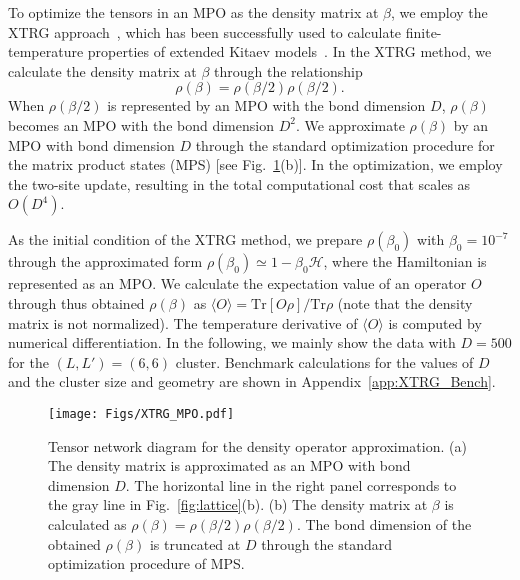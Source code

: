 \documentclass[twocolumn,superscriptaddress,showpacs, longbibliography, aps, prx]{revtex4-2}
\begin{document}
To optimize the tensors in an MPO as the density matrix at $\beta$, 
we employ the XTRG approach~\cite{Chen2018}, which has been successfully used to calculate finite-temperature properties of extended Kitaev models~\cite{Li2020, LiZWWGQLGL2021}. 
In the XTRG method, we calculate the density matrix at $\beta$ through the relationship
\begin{equation}
  \rho(\beta)=\rho(\beta/2)\rho(\beta/2).
\end{equation}
When $\rho(\beta/2)$ is represented by an MPO with the bond dimension $D$, $\rho(\beta)$ becomes an MPO with the bond dimension $D^2$. 
We approximate $\rho(\beta)$ by an MPO with bond dimension $D$ through the standard optimization procedure for the matrix product states (MPS) \cite{Chen2018} [see Fig.~\ref{fig:XTRG}(b)]. 
In the optimization, we employ the two-site update, resulting in the total computational cost that scales as $O(D^4)$. 

As the initial condition of the XTRG method, we prepare $\rho(\beta_0)$ with $\beta_0 = 10^{-7}$ through the approximated form $\rho(\beta_0) \simeq 1 - \beta_0\mathcal{H}$, where the Hamiltonian is represented as an MPO. 
We calculate the expectation value of an operator ${O}$ through thus obtained $\rho(\beta)$ as $\langle {O} \rangle = \mathrm{Tr}[{O}\rho] /\mathrm{Tr}\rho$ (note that the density matrix is not normalized). 
The temperature derivative of $\langle {O} \rangle$ is computed by numerical differentiation.
In the following, we mainly show the data with $D=500$ for the $(L, L') = (6, 6)$ cluster. 
Benchmark calculations for the values of $D$ and the cluster size and geometry are shown in Appendix~\ref{app:XTRG_Bench}. 

\begin{figure}
  \begin{center}
    \texttt{[image: Figs/XTRG\_MPO.pdf]}
  \end{center}
  \caption{Tensor network diagram for the density operator approximation. (a) The density matrix is approximated as an MPO with bond dimension $D$. 
  The horizontal line in the right panel corresponds to the gray line in Fig.~\ref{fig:lattice}(b). 
  (b) The density matrix at $\beta$ is calculated as $\rho(\beta)=\rho(\beta/2)\rho(\beta/2)$. 
  The bond dimension of the obtained $\rho(\beta)$ is truncated at $D$ through the standard optimization procedure of MPS.}
  \label{fig:XTRG}
\end{figure}
\end{document}
